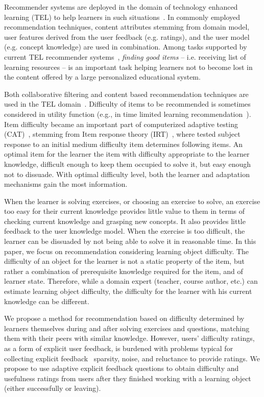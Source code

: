 \documentclass{llncs}
\begin{document}
Recommender systems are deployed in the domain of technology enhanced learning (TEL) to help learners in such situations~\cite{1.}. In commonly employed recommendation techniques, content attributes stemming from domain model, user features derived from the user feedback (e.g. ratings), and the user model (e.g. concept knowledge) are used in combination. Among tasks supported by current TEL recommender systems~\cite{1.}, \emph{finding good items} – i.e. receiving list of learning resources – is an important task helping learners not to become lost in the content offered by a large personalized educational system.

Both collaborative filtering and content based recommendation techniques are used in the TEL domain~\cite{2.}. Difficulty of items to be recommended is sometimes considered in utility function (e.g., in time limited learning recommendation~\cite{3.}). Item difficulty became an important part of computerized adaptive testing (CAT)~\cite{4.}, stemming from Item response theory (IRT)~\cite{5.}, where tested subject response to an initial medium difficulty item determines following items. An optimal item for the learner the item with difficulty appropriate to the learner knowledge, difficult enough to keep them occupied to solve it, but easy enough not to dissuade. With optimal difficulty level, both the learner and adaptation mechanisms gain the most information.

When the learner is solving exercises, or choosing an exercise to solve, an exercise too easy for their current knowledge provides little value to them in terms of checking current knowledge and grasping new concepts. It also provides little feedback to the user knowledge model. When the exercise is too difficult, the learner can be dissuaded by not being able to solve it in reasonable time. In this paper, we focus on recommendation considering learning object difficulty. The difficulty of an object for the learner is not a static property of the item, but rather a combination of prerequisite knowledge required for the item, and of learner state. Therefore, while a domain expert (teacher, course author, etc.) can estimate learning object difficulty, the difficulty for the learner with his current knowledge can be different.

We propose a method for recommendation based on difficulty determined by learners themselves during and after solving exercises and questions, matching them with their peers with similar knowledge. However, users’ difficulty ratings, as a form of explicit user feedback, is burdened with problems typical for collecting explicit feedback \textendash~sparsity, noise, and reluctance to provide ratings. We propose to use adaptive explicit feedback questions to obtain difficulty and usefulness ratings from users after they finished working with a learning object (either successfully or leaving).
\end{document}
